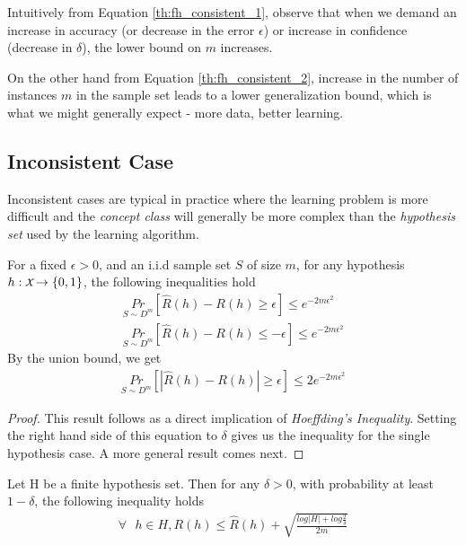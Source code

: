 \documentclass[../toml]{subfiles}
\begin{document}
Intuitively from Equation \ref{th:fh_consistent_1}, observe that when we demand an
increase in accuracy (or decrease in the error $\epsilon$) or increase in confidence
(decrease in $\delta$), the lower bound on $m$ increases.

On the other hand from Equation \ref{th:fh_consistent_2}, increase in the number of
instances $m$ in the sample set leads to a lower generalization bound, which is what
we might generally expect - more data, better learning.

\subsection{Inconsistent Case}

Inconsistent cases are typical in practice where the learning problem is more
difficult and the \textit{concept class} will generally be more complex than the
\textit{hypothesis set} used by the learning algorithm.

\begin{corollary} \label{corr:generalization_bound_single_hypothesis}
For a fixed $\epsilon > 0$, and an i.i.d sample set $S$ of size $m$, for any
hypothesis $h: \cursive{X} \to \{0,1\}$, the following inequalities hold
\begin{align}
\underset{S \sim D^m}{Pr}\left[ \hat{R}(h) - R(h) \geq \epsilon \right] \leq e^{-2m\epsilon^2} \\
\underset{S \sim D^m}{Pr}\left[ \hat{R}(h) - R(h) \leq -\epsilon \right] \leq e^{-2m\epsilon^2}
\end{align}
By the union bound, we get
\begin{align}
\underset{S \sim D^m}{Pr}\left[ |\hat{R}(h) - R(h)| \geq \epsilon \right] \leq 2e^{-2m\epsilon^2}
\end{align}
\end{corollary}
\begin{proof}
This result follows as a direct implication of \textit{Hoeffding's Inequality}. Setting
the right hand side of this equation to $\delta$ gives us the inequality for the single
hypothesis case. A more general result comes next.
\end{proof}

\begin{theorem}
Let H be a finite hypothesis set. Then for any $\delta > 0$, with probability at least
$1-\delta$, the following inequality holds
\begin{align}
\forall \text{ } h \in H, R(h) \leq \hat{R}(h) + \sqrt{\frac{log |H| + log \frac{2}{\delta}}{2m}}
\end{align}
\end{theorem}
\end{document}

